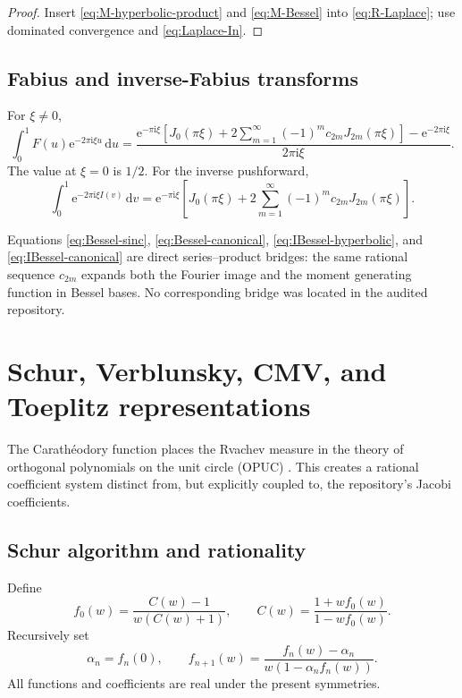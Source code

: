 \documentclass[11pt,oneside]{article}
\theoremstyle{definition}
\newcommand{\dd}{\,\mathrm d}
\newcommand{\ee}{\mathrm e}
\newcommand{\ii}{\mathrm i}
\begin{document}
\begin{proof}
Insert \eqref{eq:M-hyperbolic-product} and \eqref{eq:M-Bessel} into
\eqref{eq:R-Laplace}; use dominated convergence and \eqref{eq:Laplace-In}.
\end{proof}

\subsection{Fabius and inverse-Fabius transforms}

For \(\xi\ne0\),
\begin{equation}
 \int_0^1F(u)\ee^{-2\pi\ii\xi u}\dd u
 =\frac{\ee^{-\pi\ii\xi}
 \left[J_0(\pi\xi)+2\sum_{m=1}^{\infty}(-1)^mc_{2m}J_{2m}(\pi\xi)\right]
 -\ee^{-2\pi\ii\xi}}{2\pi\ii\xi}.
 \label{eq:F-Bessel-transform}
\end{equation}
The value at \(\xi=0\) is \(1/2\). For the inverse pushforward,
\begin{equation}
 \int_0^1\ee^{-2\pi\ii\xi I(v)}\dd v
 =\ee^{-\pi\ii\xi}\left[J_0(\pi\xi)+2\sum_{m=1}^{\infty}(-1)^mc_{2m}J_{2m}(\pi\xi)\right].
 \label{eq:I-Bessel-transform}
\end{equation}

\begin{novelbox}
Equations \eqref{eq:Bessel-sinc}, \eqref{eq:Bessel-canonical},
\eqref{eq:IBessel-hyperbolic}, and \eqref{eq:IBessel-canonical} are direct series--product
bridges: the same rational sequence \(c_{2m}\) expands both the Fourier image and the moment
generating function in Bessel bases. No corresponding bridge was located in the audited
repository.
\end{novelbox}

\section{Schur, Verblunsky, CMV, and Toeplitz representations}
\label{sec:opuc}

The Carath\'eodory function places the Rvachev measure in the theory of orthogonal
polynomials on the unit circle (OPUC) \cite{SimonOPUC1,SimonOneFoot}. This creates a rational
coefficient system distinct from, but explicitly coupled to, the repository's Jacobi
coefficients.

\subsection{Schur algorithm and rationality}

Define
\begin{equation}
 f_0(w)=\frac{C(w)-1}{w(C(w)+1)},
 \qquad C(w)=\frac{1+wf_0(w)}{1-wf_0(w)}.
 \label{eq:Schur-first}
\end{equation}
Recursively set
\begin{equation}
 \alpha_n=f_n(0),\qquad
 f_{n+1}(w)=\frac{f_n(w)-\alpha_n}{w(1-\alpha_nf_n(w))}.
 \label{eq:Schur-recursion}
\end{equation}
All functions and coefficients are real under the present symmetries.
\end{document}

